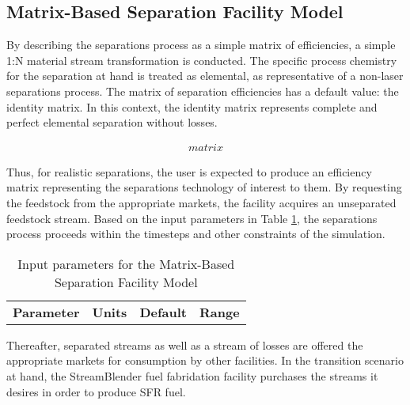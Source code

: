\subsection{Matrix-Based Separation Facility Model}

By describing the separations process as a simple matrix of efficiencies, a 
simple 1:N material stream transformation is conducted. The specific process 
chemistry for the separation at hand is treated as elemental, as representative 
of a non-laser separations process. The matrix of separation efficiencies has a 
default value: the identity matrix. In this context, the identity matrix 
represents complete and perfect elemental separation without losses. 

\begin{align}
matrix
\label{defaultsep}
\end{align}

Thus, for realistic separations, the user is expected to produce an efficiency 
matrix representing the separations technology of interest to them. 
By requesting the feedstock from the 
appropriate markets, the facility acquires an unseparated feedstock stream. 
Based on the input parameters  in Table \ref{tab:sepmatrix}, the separations 
process proceeds within the timesteps and other constraints of the simulation. 


\begin{table}
\centering
\begin{tabular}{|l|r|r|r|}
\hline
\textbf{Parameter} & \textbf{Units} & \textbf{Default} & \textbf{Range}\\ 
\end{tabular}
\caption{Input parameters for the Matrix-Based Separation Facility Model}
\label{tab:sepmatrix}
\end{table}

Thereafter, separated streams as well as a stream of losses are offered the 
appropriate markets for consumption by other facilities. In the transition 
scenario at hand, the StreamBlender fuel fabridation facility purchases the 
streams it desires in order to produce SFR fuel. 
